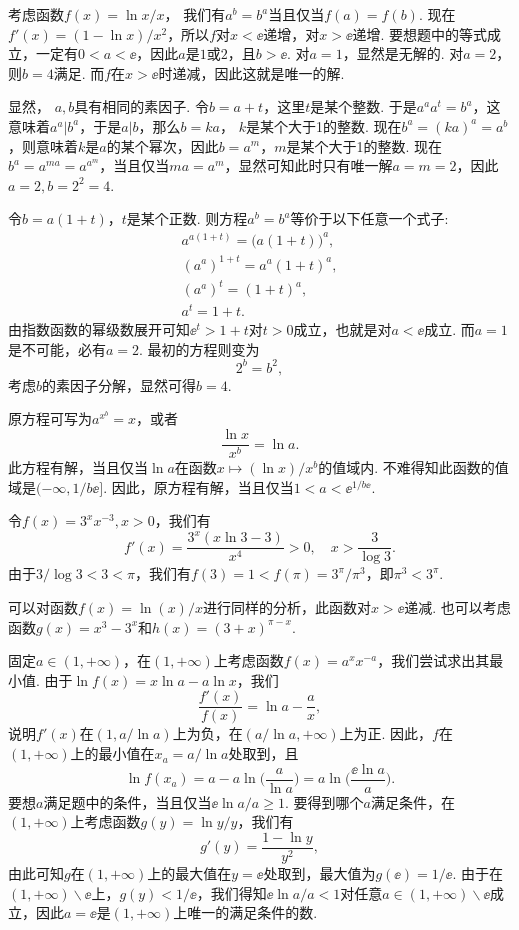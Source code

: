 \begin{ans}
  \method 考虑函数$f(x)=\ln x/x$， 我们有$a^b=b^a$当且仅当$f(a)=f(b)$. 现在$f'(x)=(1-\ln x)/x^2$，所以$f$对$x<\ee$递增，对$x>\ee$递增. 要想题中的等式成立，一定有$0<a<\ee$，因此$a$是$1$或$2$，且$b>\ee$. 对$a=1$，显然是无解的. 对$a=2$， 则$b=4$满足. 而$f$在$x>\ee$时递减，因此这就是唯一的解.

  \method 显然， $a,b$具有相同的素因子. 令$b=a+t$，这里$t$是某个整数. 于是$a^aa^t=b^a$，这意味着$a^a|b^a$，于是$a|b$，那么$b=ka$， $k$是某个大于1的整数. 现在$b^a=(ka)^a=a^b$，则意味着$k$是$a$的某个幂次，因此$b=a^m$，$m$是某个大于1的整数. 现在$b^a=a^{ma}=a^{a^m}$，当且仅当$ma=a^m$，显然可知此时只有唯一解$a=m=2$，因此$a=2,b=2^2=4$.

  \method 令$b=a(1+t)$，$t$是某个正数. 则方程$a^b=b^a$等价于以下任意一个式子:
  \begin{gather*}
    a^{a(1+t)} = \big(a(1+t)\big)^a,\\
    (a^a)^{1+t} = a^a(1+t)^a,\\
    (a^a)^t = (1+t)^a,\\
    a^t = 1+t.
  \end{gather*}
  由指数函数的幂级数展开可知$\ee^t>1+t$对$t>0$成立，也就是对$a<\ee$成立. 而$a=1$是不可能，必有$a=2$. 最初的方程则变为
  \[ 2^b=b^2, \]
  考虑$b$的素因子分解，显然可得$b=4$.
\end{ans}

\begin{ans}
  原方程可写为$a^{x^b}=x$，或者
  \[ \frac{\ln x}{x^b} = \ln a. \]
  此方程有解，当且仅当$\ln a$在函数$x\mapsto (\ln x)/x^b$的值域内. 不难得知此函数的值域是$(-\infty,1/b\ee]$. 因此，原方程有解，当且仅当$1<a<\ee^{1/b\ee}$.
\end{ans}

\begin{ans}
  \method 令$f(x)=3^xx^{-3},x>0$，我们有
  \[ f'(x)=\frac{3^x(x\ln3-3)}{x^4}>0,\quad x>\frac{3}{\log3}. \]
  由于$3/\log3<3<\pi$，我们有$f(3)=1<f(\pi)=3^\pi/\pi^3$，即$\pi^3<3^\pi$.

  \method 可以对函数$f(x)=\ln(x)/x$进行同样的分析，此函数对$x>\ee$递减. 也可以考虑函数$g(x)=x^3-3^x$和$h(x)=(3+x)^{\pi-x}$.
\end{ans}

\begin{ans}
  固定$a\in(1,+\infty)$，在$(1,+\infty)$上考虑函数$f(x)=a^xx^{-a}$，我们尝试求出其最小值. 由于$\ln f(x)=x\ln a-a\ln x$，我们
  \[ \frac{f'(x)}{f(x)} = \ln a - \frac ax, \]
  说明$f'(x)$在$(1,a/\ln a)$上为负，在$(a/\ln a,+\infty)$上为正. 因此，$f$在$(1,+\infty)$上的最小值在$x_a=a/\ln a$处取到，且
  \[ \ln f(x_a)=a-a\ln\Big(\frac a{\ln a} \Big)
  = a \ln\Big( \frac{\ee\ln a}a \Big).\]
  要想$a$满足题中的条件，当且仅当$\ee\ln a/a\ge1$. 要得到哪个$a$满足条件，在$(1,+\infty)$上考虑函数$g(y)=\ln y/y$，我们有
  \[ g'(y)=\frac{1-\ln y}{y^2}, \]
  由此可知$g$在$(1,+\infty)$上的最大值在$y=\ee$处取到，最大值为$g(\ee)=1/\ee$. 由于在$(1,+\infty)\backslash\ee$上，$g(y)<1/\ee$，我们得知$\ee\ln a/a<1$对任意$a\in(1,+\infty)\backslash\ee$成立，因此$a=\ee$是$(1,+\infty)$上唯一的满足条件的数.
\end{ans}

